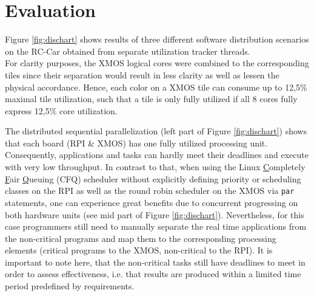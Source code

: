 \documentclass [a4paper,final,conference,10pt]{IDAACS}
\begin{document}


\section{Evaluation}
\label{sec:eval}
Figure \ref{fig:dischart} shows results of three different software distribution scenarios on the RC-Car obtained from separate utilization tracker threads. \\
For clarity purposes, the XMOS logical cores were combined to the corresponding tiles since their separation would result in less clarity as well as lessen the physical accordance. Hence, each color on a XMOS tile can consume up to 12,5\% maximal tile utilization, such that a tile is only fully utilized if all 8 cores fully express 12,5\% core utilization.

The distributed sequential parallelization (left part of Figure \ref{fig:dischart}) shows that each board (RPI \& XMOS) has one fully utilized processing unit. Consequently, applications and tasks can hardly meet their deadlines and execute with very low throughput. In contrast to that, when using the Linux \underline{C}ompletely \underline{F}air \underline{Q}ueuing (CFQ) scheduler without explicitly defining priority or scheduling classes %
on the RPI as well as the round robin scheduler on the XMOS via \texttt{par} statements, one can experience great benefits due to concurrent progressing on both hardware units (see mid part of Figure \ref{fig:dischart}). Nevertheless, for this case programmers still need to manually separate the real time applications from the non-critical programs and map them to the corresponding processing elements (critical programs to the XMOS, non-critical to the RPI). It is important to note here, that the non-critical tasks still have deadlines to meet in order to assess effectiveness, i.e. that results are produced within a limited time period predefined by requirements.
\end{document}
